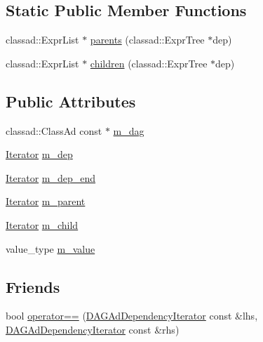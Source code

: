 \subsection*{Static Public Member Functions}
\begin{CompactItemize}
\item 
classad::Expr\-List $\ast$ \hyperlink{structglite_1_1wms_1_1jdl_1_1DAGAdDependencyIterator_e0}{parents} (classad::Expr\-Tree $\ast$dep)
\item 
classad::Expr\-List $\ast$ \hyperlink{structglite_1_1wms_1_1jdl_1_1DAGAdDependencyIterator_e1}{children} (classad::Expr\-Tree $\ast$dep)
\end{CompactItemize}
\subsection*{Public Attributes}
\begin{CompactItemize}
\item 
classad::Class\-Ad const $\ast$ \hyperlink{structglite_1_1wms_1_1jdl_1_1DAGAdDependencyIterator_o0}{m\_\-dag}
\item 
\hyperlink{structglite_1_1wms_1_1jdl_1_1DAGAdDependencyIterator_w1}{Iterator} \hyperlink{structglite_1_1wms_1_1jdl_1_1DAGAdDependencyIterator_o1}{m\_\-dep}
\item 
\hyperlink{structglite_1_1wms_1_1jdl_1_1DAGAdDependencyIterator_w1}{Iterator} \hyperlink{structglite_1_1wms_1_1jdl_1_1DAGAdDependencyIterator_o2}{m\_\-dep\_\-end}
\item 
\hyperlink{structglite_1_1wms_1_1jdl_1_1DAGAdDependencyIterator_w1}{Iterator} \hyperlink{structglite_1_1wms_1_1jdl_1_1DAGAdDependencyIterator_o3}{m\_\-parent}
\item 
\hyperlink{structglite_1_1wms_1_1jdl_1_1DAGAdDependencyIterator_w1}{Iterator} \hyperlink{structglite_1_1wms_1_1jdl_1_1DAGAdDependencyIterator_o4}{m\_\-child}
\item 
value\_\-type \hyperlink{structglite_1_1wms_1_1jdl_1_1DAGAdDependencyIterator_o5}{m\_\-value}
\end{CompactItemize}
\subsection*{Friends}
\begin{CompactItemize}
\item 
bool \hyperlink{structglite_1_1wms_1_1jdl_1_1DAGAdDependencyIterator_n0}{operator==} (\hyperlink{structglite_1_1wms_1_1jdl_1_1DAGAdDependencyIterator}{DAGAd\-Dependency\-Iterator} const \&lhs, \hyperlink{structglite_1_1wms_1_1jdl_1_1DAGAdDependencyIterator}{DAGAd\-Dependency\-Iterator} const \&rhs)
\end{CompactItemize}


